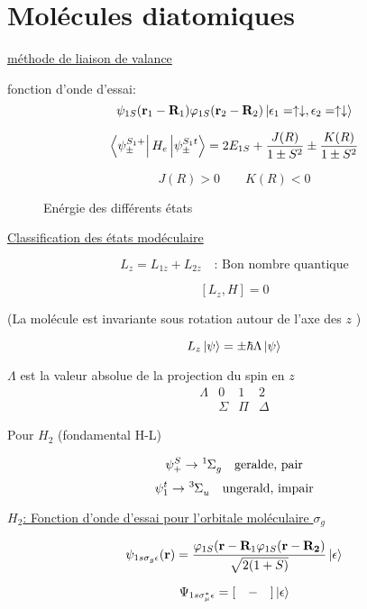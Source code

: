 

\usepackage{tensor}
\usepackage{mhchem}



\section*{Molécules diatomiques}

\underline{méthode de liaison de valance}

fonction d'onde d'essai: $$\psi_{1S}(\vb{r}_1 - \vb{R}_1) \varphi_{1S} (\vb{r}_2 - \vb{R}_2) \ket{\epsilon_{1}=\uparrow\downarrow, \epsilon_{2} = \uparrow\downarrow}$$ 

$$\bra{\psi_{\pm}^{S_1+}}H_{e} \ket{\psi_{\pm}^{S_1t} } = 2 E_{1S} + \frac{J(R)}{1\pm S^2} \pm \frac{K(R)}{1\pm S^2}$$ 

$$J(R) > 0 \qquad K(R) < 0$$ 

\begin{figure}[ht]
    \centering
    \caption{Enérgie des différents états}
    \label{fig:enérgie-des-différents-états}
\end{figure}

\underline{Classification des états modéculaire} 

$$L_{z} = L_{1z} + L_{2z}\quad \text{: Bon nombre quantique}$$ 

$$[L_{z}, H] =0$$

(La molécule est invariante sous rotation autour de l'axe des $z$ )

$$L_{z} \ket{\psi} = \pm \hbar \Lambda \ket{\psi}$$ 

$\Lambda$ est la valeur absolue de la projection du spin en $z$  
$$\begin{matrix} \Lambda & 0 &1 &2\\ &\Sigma&\Pi & \Delta
\end{matrix}$$  

Pour $H_2$ (fondamental H-L)

$$\psi_{+}^S \to \tensor[^1]{\Sigma}{_g} \quad \text{geralde, pair}$$ 
$$\psi_{1}^t \to \tensor[^3]{\Sigma}{_u} \quad\text{ungerald, impair}$$ 


\underline{ $H_2$: Fonction d'onde d'essai pour l'orbitale moléculaire $\sigma_g$ } 

$$\psi_{1s\sigma_g\epsilon} (\vb{r}) = \frac{\varphi_{1S} (\vb{r}- \vb{R}_1 \varphi_{1S} (\vb{r}- \vb{R_2})}{\sqrt{2(1+S)}}\ket{\epsilon}$$ 

$$\Psi_{1s\sigma_{\mu}^*\epsilon} = [\quad - \quad] \ket{\epsilon}$$ 

